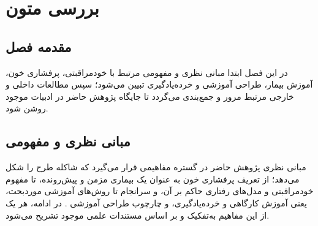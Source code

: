 \ChapterStart
\chapter{بررسی متون}
\label{ch:literature}
\section{مقدمه فصل}
\label{sec:ch2-intro}
در این فصل ابتدا مبانی نظری و مفهومی مرتبط با خودمراقبتی، پرفشاری خون، آموزش
بیمار، طراحی آموزشی و خرده‌یادگیری تبیین می‌شود؛ سپس مطالعات داخلی و خارجی
مرتبط مرور و جمع‌بندی می‌گردد تا جایگاه پژوهش حاضر در ادبیات موجود روشن شود.

\section{مبانی نظری و مفهومی}
\label{sec:theoretical}
مبانی نظری پژوهش حاضر در گستره مفاهیمی قرار می‌گیرد که شاکله طرح را شکل می‌دهد؛ از تعریف پرفشاری خون به عنوان یک بیماری مزمن و پیش‌رونده، تا مفهوم خودمراقبتی و مدل‌های رفتاری حاکم بر آن، و سرانجام تا روش‌های آموزشی موردبحث، یعنی آموزش کارگاهی و خرده‌یادگیری، و چارچوب طراحی آموزشی . در ادامه، هر یک از این مفاهیم به‌تفکیک و بر اساس مستندات علمی موجود تشریح می‌شود.

